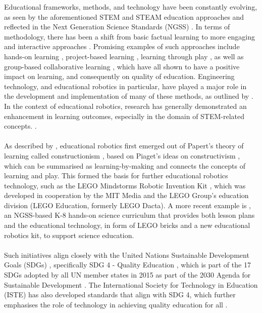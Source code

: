 Educational frameworks, methods, and technology have been constantly evolving, as seen by the aforementioned STEM and STEAM education approaches and reflected in the Next Generation Science Standards (NGSS) \citep{noauthor_next_2013}. In terms of methodology, there has been a shift from basic factual learning to more engaging and interactive approaches \citep{atkin_inside_2003, noauthor_next_2013, }. Promising examples of such approaches include hands-on learning \citep{satterthwait_why_2010, vesilind_hands-_1996}, project-based learning \citep{sawyer_project-based_2014, kokotsaki_project-based_2016, samsudin_effect_2020, markula_key_2022}, learning through play \citep{weisberg_guided_2013, zosh_learning_2017, parker_learning_2022}, as well as group-based collaborative learning \citep{tonkal_exploring_2024, brennan_implementing_2023}, which have all shown to have a positive impact on learning, and consequently on quality of education. Engineering technology, and educational robotics in particular, have played a major role in the development and implementation of many of these methods, as outlined by \citet{khine_robotics_2017}. In the context of educational robotics, research has generally demonstrated an enhancement in learning outcomes, especially in the domain of STEM-related concepts. \citep{benitti_exploring_2012, lego_education_stem_nodate, afari_robotics_2017}. 
\\\\
As described by \citet{sapounidis_educational_2020}, educational robotics first emerged out of Papert's theory of learning called constructionism \citep{papert_constructionism_1991}, based on Piaget’s ideas on constructivism \citep{von_glasersfeld_interpretation_1982}, which can be summarised as learning-by-making and connects the concepts of learning and play. This formed the basis for further educational robotics technology, such 
as the LEGO Mindstorms Robotic Invention Kit \citep{mindell_lego_2000}, which was developed in cooperation by the MIT Media and the LEGO Group's education division (LEGO Education, formerly LEGO Dacta).
A more recent example is \citet{noauthor_lego_nodate}, an NGSS-based K-8 hands-on science curriculum that provides both lesson plans and the educational technology, in form of LEGO bricks and a new educational robotics kit, to support science education. \citep{lego_education_stem_nodate} 
\\\\
Such initiatives align closely with the United Nations Sustainable Development Goals (SDGs) \citep{united_nations_department_of_economic_and_social_affairs_17_nodate}, specifically SDG 4 - Quality Education \citep{united_nations_department_of_economic_and_social_affairs_goal_nodate}, which is part of the 17 SDGs  adopted by all UN member states in 2015 as part of the 2030 Agenda for Sustainable Development \citet{united_nations_department_of_economics_and_social_affairs_sustainable_nodate}. The International Society for Technology in Education (ISTE) has also developed standards that align with SDG 4, which further emphasises the role of technology in achieving quality education for all \citep{iste_iste_nodate, noauthor_technology_2023}.
